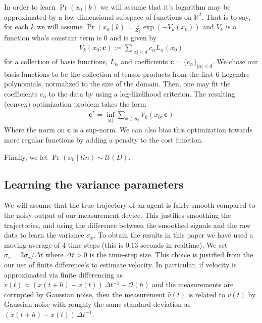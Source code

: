 \documentclass[conference]{IEEEtran}
\begin{document}
  In order to learn $\Pr( x_0 \mid k)$ we will assume that it's logarithm may be approximated by a low dimensional subspace of functions on $\mathbb{R}^2$.
  That is to say, for each $k$ we will assume $\Pr( x_0 \mid k) = \frac{1}{Z_k} \exp( - V_k(x_0) )$ and $V_k$ is a function who's constant term is $0$ and is given by
  \begin{align*}
  	V_k(x_0; \mathbf{c} ) := \sum_{|\alpha|< d} c_{\alpha} L_{\alpha}( x_0)
  \end{align*}
  for a collection of basis functions, $L_{\alpha}$ and coefficients $\mathbf{c} = \{ c_{\alpha} \}_{|\alpha| < d}$.
  We chose our basis functions to be the collection of tensor products from the first $6$ Legendre polynomials, normalized to the size of the domain.
  Then, one may fit the coefficients $c_{\alpha}$ to the data by using a log-likelihood criterion.
  The resulting (convex) optimization problem takes the form
  \begin{align*}
  	\mathbf{c}^* = \inf_{ |\mathbf{c}| } \sum_{x \in S_k} V_k( x_0; \mathbf{c})
  \end{align*}
  Where the norm on $\mathbf{c}$ is a sup-norm.
  We can also bias this optimization towards more regular functions by adding a penalty to the cost function.
  
  Finally, we let $\Pr( x_0 \mid lin) \sim \mathcal{U}(D)$.
  
  \subsection{Learning the variance parameters}
  We will assume that the true trajectory of an agent is fairly smooth compared to the noisy output of our measurement device.
  This justifies smoothing the trajectories, and using the difference between the smoothed signals and the raw data to learn the variance $\sigma_x$.
  To obtain the results in this paper we have used a moving average of $4$ time steps (this is $0.13$ seconds in realtime).
  We set $\sigma_v = 2 \sigma_x / \Delta t$ where $\Delta t > 0$ is the time-step size.  This choice is justified from the our use of finite difference's to estimate velocity.
  In particular, if velocity is approximated via finite differencing as $v(t) \approx (x(t+h) - x(t))\,\Delta t^{-1} + \mathcal{O}(h)$
  and the measurements are corrupted by Gaussian noise, then the measurement $\hat{v}(t)$ is related to $v(t)$ by Gaussian noise with roughly the same standard deviation as $(x(t+h) - x(t))\,\Delta t^{-1}$.
  
\end{document}
